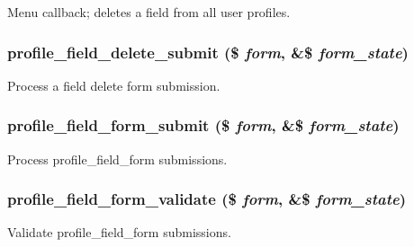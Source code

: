 Menu callback; deletes a field from all user profiles. \hypertarget{profile_8admin_8inc_4b5d228dbc4ee4a3091c72b8d4530f38}{
\subsubsection[{profile\_\-field\_\-delete\_\-submit}]{\setlength{\rightskip}{0pt plus 5cm}profile\_\-field\_\-delete\_\-submit (\$ {\em form}, \/  \&\$ {\em form\_\-state})}}
\label{profile_8admin_8inc_4b5d228dbc4ee4a3091c72b8d4530f38}


Process a field delete form submission. \hypertarget{profile_8admin_8inc_25efcaa4c4b8e9dc9568622ad0ab3411}{
\subsubsection[{profile\_\-field\_\-form\_\-submit}]{\setlength{\rightskip}{0pt plus 5cm}profile\_\-field\_\-form\_\-submit (\$ {\em form}, \/  \&\$ {\em form\_\-state})}}
\label{profile_8admin_8inc_25efcaa4c4b8e9dc9568622ad0ab3411}


Process profile\_\-field\_\-form submissions. \hypertarget{profile_8admin_8inc_68cc1dfe2c4f0e0946ede9786b4554e2}{
\subsubsection[{profile\_\-field\_\-form\_\-validate}]{\setlength{\rightskip}{0pt plus 5cm}profile\_\-field\_\-form\_\-validate (\$ {\em form}, \/  \&\$ {\em form\_\-state})}}
\label{profile_8admin_8inc_68cc1dfe2c4f0e0946ede9786b4554e2}


Validate profile\_\-field\_\-form submissions. 